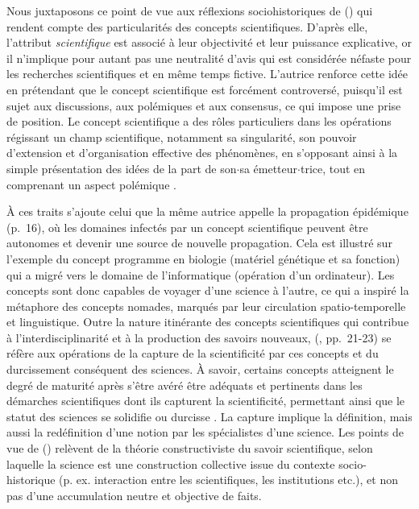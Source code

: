Nous juxtaposons ce point de vue aux réflexions sociohistoriques de \citeauthor{stengers1987d} (\citeyear{stengers1987d}) qui rendent compte des particularités des concepts scientifiques. D'après elle, l'attribut \textit{scientifique} est associé à leur objectivité et leur puissance explicative, or il n'implique pour autant pas une neutralité d'avis qui est considérée néfaste pour les recherches scientifiques et en même temps fictive. L'autrice renforce cette idée en prétendant que le concept scientifique est forcément controversé, puisqu'il est sujet aux discussions, aux polémiques et aux consensus, ce qui impose une prise de position. Le concept scientifique a des rôles particuliers dans les opérations régissant un champ scientifique, notamment sa singularité, son pouvoir d'extension et d'organisation effective des phénomènes, en s'opposant ainsi à la simple présentation des idées de la part de son$\cdot$sa émetteur$\cdot$trice, tout en comprenant un aspect polémique \citep[pp.~10-11]{stengers1987d}. 

À ces traits s'ajoute celui que la même autrice appelle \og{}la propagation épidémique\fg{} (p.~16), où les domaines \og{}infectés\fg{} par un concept scientifique peuvent être autonomes et devenir une source de nouvelle propagation. Cela est illustré sur l'exemple du concept \og programme \fg{} en biologie (matériel génétique et sa fonction) qui a migré vers le domaine de l'informatique (opération d'un ordinateur). Les concepts sont donc capables de voyager d'une science à l'autre, ce qui a inspiré la métaphore des \og{}concepts nomades\fg{}, marqués par leur circulation spatio-temporelle et linguistique. Outre la nature itinérante des concepts scientifiques qui contribue à l'interdisciplinarité et à la production des savoirs nouveaux, \citeauthor{stengers1987d} (\citeyear{stengers1987d}, pp.~21-23) se réfère aux opérations de la \og capture \fg{} de la scientificité par ces concepts et du \og durcissement \fg{} conséquent des sciences. À savoir, certains concepts atteignent le degré de maturité après s'être avéré être adéquats et pertinents dans les démarches scientifiques dont ils \og{}capturent\fg{} la scientificité, permettant ainsi que le statut des sciences se solidifie ou \og durcisse \fg{}. La capture implique la définition, mais aussi la redéfinition d'une notion par les spécialistes d'une science. Les points de vue de \citeauthor{stengers1987d} (\citeyear{stengers1987d}) relèvent de la théorie constructiviste du savoir scientifique, selon laquelle la science est une \og{}construction\fg{} collective issue du contexte socio-historique (p. ex. interaction entre les scientifiques, les institutions etc.), et non pas d'une accumulation neutre et objective de faits.

